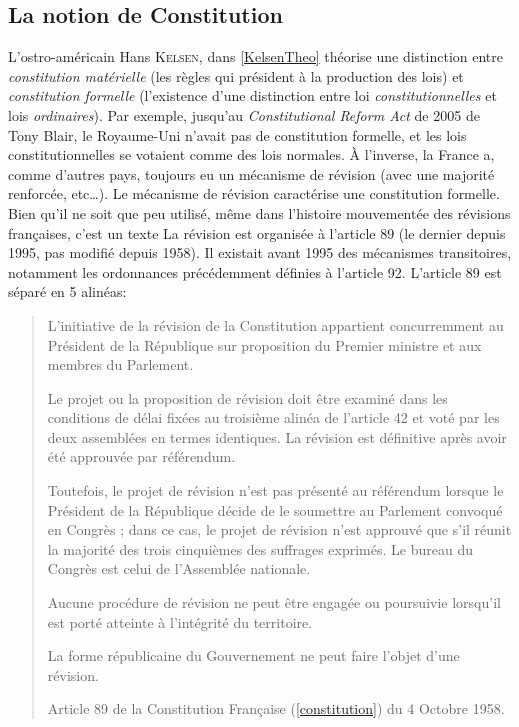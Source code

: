 \documentclass[math]{cours}
\begin{document}
\subsection{La notion de Constitution}
L'ostro-américain Hans \textsc{Kelsen}, dans \ref{KelsenTheo} théorise une distinction entre \emph{constitution matérielle} (les règles qui président à la production des lois) et \emph{constitution formelle} (l'existence d'une distinction entre loi \emph{constitutionnelles} et lois \emph{ordinaires}).
Par exemple, jusqu'au \emph{Constitutional Reform Act} de 2005 de Tony Blair, le Royaume-Uni n'avait pas de constitution formelle, et les lois constitutionnelles se votaient comme des lois normales.
À l'inverse, la France a, comme d'autres pays, toujours eu un mécanisme de révision (avec une majorité renforcée, etc\ldots).
Le mécanisme de révision caractérise une constitution formelle.
Bien qu'il ne soit que peu utilisé, même dans l'histoire mouvementée des révisions françaises, c'est un texte
La révision est organisée à l'article 89 (le dernier depuis 1995, pas modifié depuis 1958). Il existait avant 1995 des mécanismes transitoires, notamment les ordonnances précédemment définies à l'article 92.
L'article 89 est séparé en 5 alinéas:
\begin{quote}
	L'initiative de la révision de la Constitution appartient concurremment au Président de la République sur proposition du Premier ministre et aux membres du Parlement.

	Le projet ou la proposition de révision doit être examiné dans les conditions de délai fixées au troisième alinéa de l'article 42 et voté par les deux assemblées en termes identiques. La révision est définitive après avoir été approuvée par référendum.

	Toutefois, le projet de révision n'est pas présenté au référendum lorsque le Président de la République décide de le soumettre au Parlement convoqué en Congrès ; dans ce cas, le projet de révision n'est approuvé que s'il réunit la majorité des trois cinquièmes des suffrages exprimés. Le bureau du Congrès est celui de l'Assemblée nationale.

	Aucune procédure de révision ne peut être engagée ou poursuivie lorsqu'il est porté atteinte à l'intégrité du territoire.

	La forme républicaine du Gouvernement ne peut faire l'objet d'une révision.
	\begin{center}
		Article 89 de la Constitution Française (\ref{constitution}) du 4 Octobre 1958.
	\end{center}
\end{quote}
\end{document}
